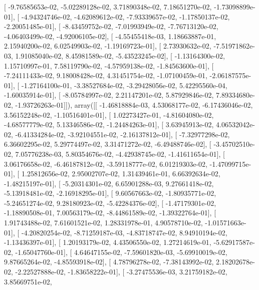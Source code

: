 \documentclass{article}
\begin{document}
       [ -9.76585653e-02,  -5.02289128e-02,   3.71890348e-02,
          7.18651270e-02,  -1.73098899e-01],
       [ -4.94324746e-02,  -4.62089612e-02,  -7.93339657e-02,
         -1.17850137e-02,  -2.20051485e-01],
       [ -8.43459752e-02,  -7.01993949e-02,  -7.76713120e-02,
         -4.06403499e-02,  -4.92006105e-02],
       [ -4.55455418e-03,   1.18663887e-01,   2.15940200e-02,
          6.02549903e-02,  -1.19169723e-01],
       [  2.73930632e-02,  -7.51971862e-03,   1.91085040e-02,
          8.45981589e-02,  -5.43523245e-02],
       [ -1.13164300e-02,   1.15710997e-01,   7.58119790e-02,
         -4.57959138e-02,  -1.84563600e-01],
       [ -7.24111433e-02,   9.18008428e-02,   4.31451754e-02,
         -1.07100459e-01,  -2.06187575e-01],
       [ -1.27164100e-01,  -3.38527684e-02,  -3.29428056e-02,
          5.42295560e-04,  -1.60035914e-01],
       [ -8.05784997e-02,   2.21147201e-02,   5.87929846e-02,
          7.89334680e-02,  -1.93726263e-01]]), array([[ -1.46818884e-03,   4.53068177e-02,  -6.17436046e-02,
          3.56152248e-02,  -1.10516401e-01],
       [  1.02273427e-01,  -4.81604080e-02,  -4.68577779e-02,
          5.13346586e-02,  -1.24484263e-01],
       [  3.63945913e-02,   4.06532042e-02,  -6.41334284e-02,
         -3.92104551e-02,  -2.16137812e-01],
       [ -7.32977298e-02,   6.36602295e-02,   5.29774497e-02,
          3.31471272e-02,  -6.49488746e-02],
       [ -3.45702510e-02,   7.05776238e-03,   5.80354676e-02,
         -4.42938745e-02,  -1.41611654e-01],
       [  3.06176658e-02,  -6.46187812e-02,  -3.59118777e-02,
          6.01219303e-02,  -1.47099715e-01],
       [  1.25812656e-02,   2.95002707e-02,   1.31439461e-01,
          6.66392634e-02,  -1.48215197e-01],
       [ -5.20314301e-02,   6.65901288e-03,   9.27661418e-02,
         -5.13918481e-02,  -2.16918295e-01],
       [  9.60567663e-02,  -1.80935771e-02,  -5.24651274e-02,
          9.28180923e-02,  -5.42284376e-02],
       [ -1.47179301e-02,  -1.18890508e-01,   7.00563179e-02,
         -8.44861589e-02,  -1.39322764e-01],
       [  1.91743488e-02,   7.61601521e-02,   1.28331978e-01,
          4.90578710e-02,  -1.01571663e-01],
       [ -4.20820254e-02,  -8.71259187e-03,  -4.83718747e-02,
          8.94910194e-02,  -1.13436397e-01],
       [  1.20193179e-02,   4.43506550e-02,   1.27214619e-01,
         -5.62917587e-02,  -1.65047760e-01],
       [  4.64647155e-02,  -7.59601820e-03,  -5.69910019e-02,
          9.87665264e-02,  -4.85593918e-02],
       [  4.78796278e-02,  -7.38143992e-02,   2.18202678e-02,
         -2.22527888e-02,  -1.83658222e-01],
       [ -3.27475536e-03,   3.21759182e-02,   3.85669751e-02,
\end{document}
